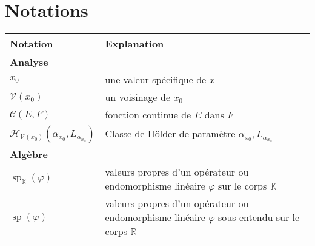 \chapter*{Notations}


\begin{tabularx}{\textwidth}{lX}
	\toprule
	\textbf{Notation}                                                & \textbf{Explanation}                                                                                                                               \\
	\midrule
	\textbf{Analyse}                                                 &                                                                                                                                                    \\
	\midrule
	$x_0$                                                            & une valeur spécifique de $x$                                                                                                                       \\
	$\mathcal{V}(x_0)$                                               & un voisinage de $x_0$                                                                                                                              \\
	$\mathcal C(E, F)$                                               & fonction continue de $E$ dans $F$                                                                                                                  \\
	$\mathcal{H}_{\mathcal{V}(x_0)}(\alpha_{x_0}, L_{\alpha_{x_0}})$ & Classe de Hölder de paramètre $\alpha_{x_0}, L_{\alpha_{x_0}}$                                                                                     \\
	\midrule
	\textbf{Algèbre}                                                 &                                                                                                                                                    \\
	\midrule
	$\operatorname{sp}_{\mathds K}(\varphi)$                         & valeurs propres d'un opérateur ou endomorphisme linéaire $\varphi$ sur le corps $\mathds K$                                                        \\
	$\operatorname{sp}(\varphi)$                                     & valeurs propres d'un opérateur ou endomorphisme linéaire $\varphi$ sous-entendu sur le corps $\mathds R$                                           \\

\end{tabularx}
